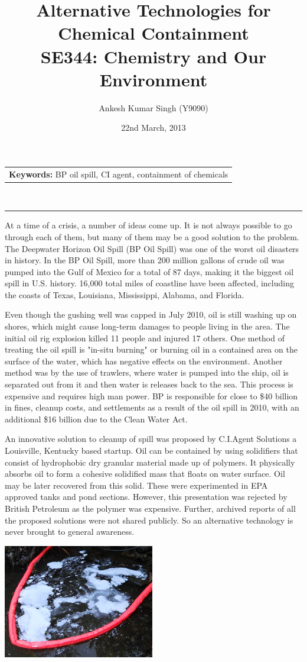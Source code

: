 \documentclass[pdftex,12pt,a4paper]{article}
\title{\vspace{-15pt}Alternative Technologies for Chemical Containment\\ SE344: Chemistry and Our Environment}
\author{Ankesh Kumar Singh (Y9090)}
\date{22nd March, 2013}
\begin{document}
\maketitle
\begin{tabular}{p{370pt}}
\textbf{Keywords: }BP oil spill, CI agent, containment of chemicals
\end{tabular}
\vspace{10pt}\\
\hrule
\vspace{10pt}
At a time of a crisis, a number of ideas come up. It is not always possible to go through each of them, but many of them may be a good solution to the problem. The Deepwater Horizon Oil Spill (BP Oil Spill) was one of the worst oil disasters in history. In the BP Oil Spill, more than 200 million gallons of crude oil was pumped into the Gulf of Mexico for a total of 87 days, making it the biggest oil spill in U.S. history. 16,000 total miles of coastline have been affected, including the coasts of Texas, Louisiana, Mississippi, Alabama, and Florida.

Even though the gushing well was capped in July 2010, oil is still washing up on shores, which might cause long-term damages to people living in the area. The initial oil rig explosion killed 11 people and injured 17 others. One method of treating the oil spill is "in-situ burning" or burning oil in a contained area on the surface of the water, which has negative effects on the environment. Another method was by the use of trawlers, where water is pumped into the ship, oil is separated out from it and then water is releases back to the sea. This process is expensive and requires high man power. BP is responsible for close to \$40 billion in fines, cleanup costs, and settlements as a result of the oil spill in 2010, with an additional \$16 billion due to the Clean Water Act.

An innovative solution to cleanup of spill was proposed by C.I.Agent Solutions a Louisville, Kentucky based startup. Oil can be contained by using solidifiers that consist of hydrophobic dry granular material made up of polymers. It physically absorbs oil to form a cohesive solidified mass that floats on water surface. Oil may be later recovered from this solid. These were experimented in EPA approved tanks and pond sections. However, this presentation was rejected by British Petroleum as the polymer was expensive. Further, archived reports of all the proposed solutions were not shared publicly. So an alternative technology is never brought to general awareness.
\begin{center}
\includegraphics{cia.jpg}
\end{center}
\end{document}
